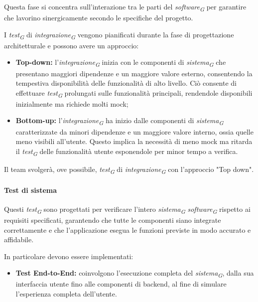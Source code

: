 \vspace{0.2cm}

Questa fase si concentra sull'interazione tra le parti del \textit{software}\textsubscript{\textit{G}} per garantire che lavorino sinergicamente secondo le specifiche del progetto.

I \textit{test}\textsubscript{\textit{G}} di \textit{integrazione}\textsubscript{\textit{G}} vengono pianificati durante la fase di progettazione architetturale e possono avere un approccio: 

\begin{itemize}
    \item \textbf{Top-down:}
        l'\textit{integrazione}\textsubscript{\textit{G}} inizia con le componenti di \textit{sistema}\textsubscript{\textit{G}} che presentano maggiori dipendenze e un maggiore valore esterno, consentendo la tempestiva disponibilità delle funzionalità di alto livello. Ciò consente di effettuare \textit{test}\textsubscript{\textit{G}} prolungati sulle funzionalità principali, rendendole disponibili inizialmente ma richiede molti mock;
    \item \textbf{Bottom-up:}
        l'\textit{integrazione}\textsubscript{\textit{G}} ha inizio dalle componenti di \textit{sistema}\textsubscript{\textit{G}} caratterizzate da minori dipendenze e un maggiore valore interno, ossia quelle meno visibili all'utente. Questo implica la necessità di meno mock ma ritarda il \textit{test}\textsubscript{\textit{G}} delle funzionalità utente esponendole per minor tempo a verifica.
\end{itemize}

Il team svolgerà, ove possibile, \textit{test}\textsubscript{\textit{G}} di \textit{integrazione}\textsubscript{\textit{G}} con l'approccio "Top down". 

\paragraph{Test di sistema}
Questi \textit{test}\textsubscript{\textit{G}} sono progettati per verificare l'intero \textit{sistema}\textsubscript{\textit{G}} \textit{software}\textsubscript{\textit{G}} rispetto ai requisiti specificati, garantendo che tutte le componenti siano integrate correttamente e che l'applicazione esegua le funzioni previste in modo accurato e affidabile. 

\vspace{0.2cm}

In particolare devono essere implementati: 
\begin{itemize}
    \item \textbf{Test End-to-End:} 
        coinvolgono l'esecuzione completa del \textit{sistema}\textsubscript{\textit{G}}, dalla sua interfaccia utente fino alle componenti di backend, al fine di simulare l'esperienza completa dell'utente.
\end{itemize} 

